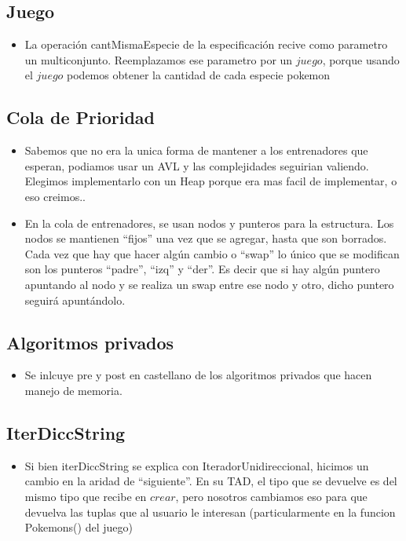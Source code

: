
\subsection{Juego}

\begin{itemize}
\item{La operaci\'on cantMismaEspecie de la especificaci\'on recive como parametro un multiconjunto. 
Reemplazamos ese parametro por un $juego$, porque usando el $juego$ podemos obtener la cantidad de cada especie pokemon}

\end{itemize}

\subsection{Cola de Prioridad}

\begin{itemize}

\item{Sabemos que no era la unica forma de mantener a los entrenadores que esperan, podiamos usar un AVL y las complejidades seguirian valiendo. Elegimos implementarlo con un Heap porque era mas facil de implementar, o eso creimos..}

\item{En la cola de entrenadores, se usan nodos y punteros para la estructura. Los nodos se mantienen ``fijos'' una vez que se agregar, hasta que son borrados. Cada vez que hay que hacer alg\'un cambio o ``swap'' lo \'unico que se modifican son los punteros ``padre'', ``izq'' y ``der''. Es decir que si hay alg\'un puntero apuntando al nodo y se realiza un swap entre ese nodo y otro, dicho puntero seguir\'a apunt\'andolo.}

\end{itemize}


\subsection{Algoritmos privados}

\begin{itemize}

\item{Se inlcuye pre y post en castellano de los algoritmos privados que hacen manejo de memoria.}

\end{itemize}


\subsection{IterDiccString}

\begin{itemize}

\item{Si bien iterDiccString se explica con IteradorUnidireccional, hicimos un cambio en la aridad de ``siguiente''. En su TAD, el tipo que se devuelve es del mismo tipo que recibe en $crear$, pero nosotros cambiamos eso para que devuelva las tuplas que al usuario le interesan (particularmente en la funcion Pokemons() del juego)}

\end{itemize}


